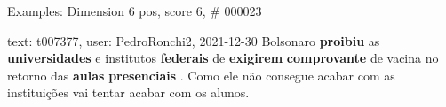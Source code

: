 \begin{frame}{Examples: Dimension 6 pos, score 6, \# 000023}
\footnotesize
\begin{exampleblock}{text: t007377, user: PedroRonchi2, 2021-12-30}
Bolsonaro \textbf{proibiu} as \textbf{universidades} e institutos 
\textbf{federais} de \textbf{exigirem} \textbf{comprovante} de vacina no 
retorno das \textbf{aulas} \textbf{presenciais} . Como ele não consegue acabar 
com as instituições vai tentar acabar com os alunos. 
\end{exampleblock}
\end{frame}
